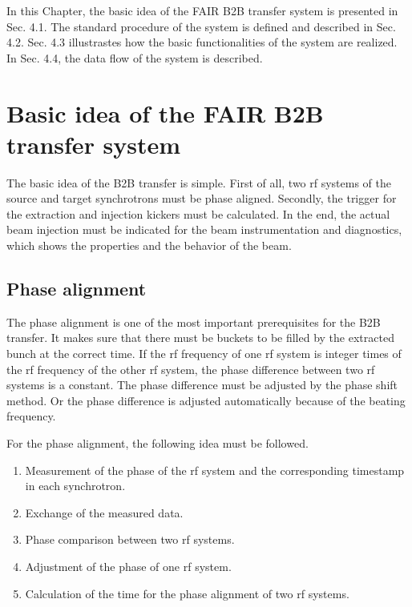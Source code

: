

In this Chapter, the basic idea of the FAIR B2B transfer system is presented in Sec. 4.1. The standard procedure of the system is defined and described in Sec. 4.2. Sec. 4.3 illustrastes how the basic functionalities of the system are realized. In Sec. 4.4, the data flow of the system is described. 

\section{Basic idea of the FAIR B2B transfer system} 
The basic idea of the B2B transfer is simple. First of all, two rf systems of the source and target synchrotrons must be phase aligned. Secondly, the trigger for the extraction and injection kickers must be calculated. In the end, the actual beam injection must be indicated for the beam instrumentation and diagnostics, which shows the properties and the behavior of the beam. 

\subsection{Phase alignment}
The phase alignment is one of the most important prerequisites for the B2B transfer. It makes sure that there must be buckets to be filled by the extracted bunch at the correct time. If the rf frequency of one rf system is integer times of the rf frequency of the other rf system, the phase difference between two rf systems is a constant. The phase difference must be adjusted by the phase shift method. Or the phase difference is adjusted automatically because of the beating frequency. %

For the phase alignment, the following idea must be followed. 
\begin{enumerate}
\item Measurement of the phase of the rf system and the corresponding timestamp in each synchrotron.
\item Exchange of the measured data.
\item Phase comparison between two rf systems.
\item Adjustment of the phase of one rf system. 
\item Calculation of the time for the phase alignment of two rf systems.
\end{enumerate}
